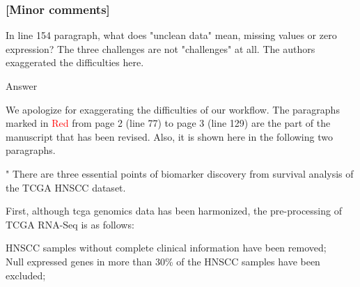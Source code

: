 \documentclass[preprint,12pt]{elsarticle}
\newenvironment{MyIndent}
{\par\leftskip1cm\relax\rightskip1cm\relax}
{\par\leftskip0cm\relax\rightskip0cm\relax}
\newenvironment{MyColorPar}[1]{%
    \leavevmode\color{#1}\ignorespaces%
}{%
}%
\begin{document}
\begin{MyColorPar}{blue}
\begin{MyIndent}
\begin{MyColorPar}{red}


%


\end{MyColorPar} %
\end{MyIndent}

\begin{MyColorPar}{black} %
\subsubsection*{[Minor comments]}

In line 154 paragraph, what does "unclean data" mean, missing values or zero expression? 
The three challenges are not "challenges" at all. The authors exaggerated the difficulties here.\\[0.3cm]
\end{MyColorPar}

Answer

We apologize for exaggerating the difficulties of our workflow.
The paragraphs marked in \textcolor{red}{Red} from page 2 (line 77) to page 3 (line 129) are the part of the manuscript that has been revised. Also, it is shown here in the following two paragraphs.


\begin{MyIndent}
\begin{MyColorPar}{red}
"
There are three essential points of biomarker discovery from survival analysis of the TCGA HNSCC dataset.

First, although \acrshort{tcga} genomics data has been harmonized, 
the pre-processing of TCGA RNA-Seq is as follows: 

\begin{outline}
\1 HNSCC samples without complete clinical information have been removed;\\
\1 Null expressed genes in more than 30\% of the HNSCC samples have been excluded;\\


\end{outline}
\end{MyColorPar}
\end{MyIndent}
\end{MyColorPar}
\end{document}

